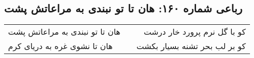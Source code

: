 \begin{center}
\section*{رباعی شماره ۱۶۰: هان تا تو نبندی به مراعاتش پشت}
\label{sec:sh160}
\begin{longtable}{l p{0.5cm} r}
هان تا تو نبندی به مراعاتش پشت
&&
کو با گل نرم پرورد خار درشت
\\
هان تا نشوی غره به دریای کرم
&&
کو بر لب بحر تشنه بسیار بکشت
\\
\end{longtable}
\end{center}
